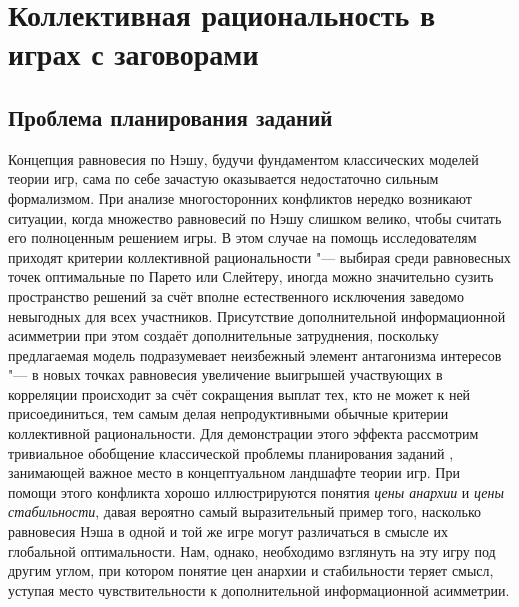 \chapter{Коллективная рациональность в играх с заговорами}\label{ch:ch2}

\section{Проблема планирования заданий}\label{sec:ch2/sec1}

Концепция равновесия по Нэшу, будучи фундаментом классических моделей теории игр, сама по себе зачастую оказывается недостаточно сильным формализмом. При анализе многосторонних конфликтов нередко возникают ситуации, когда множество равновесий по Нэшу слишком велико, чтобы считать его полноценным решением игры. В этом случае на помощь исследователям приходят критерии коллективной рациональности "--- выбирая среди равновесных точек оптимальные по Парето или Слейтеру, иногда можно значительно сузить пространство решений за счёт вполне естественного исключения заведомо невыгодных для всех участников. Присутствие дополнительной информационной асимметрии при этом создаёт дополнительные затруднения, поскольку предлагаемая модель подразумевает неизбежный элемент антагонизма интересов "--- в новых точках равновесия увеличение выигрышей участвующих в корреляции происходит за счёт сокращения выплат тех, кто не может к ней присоединиться, тем самым делая непродуктивными обычные критерии коллективной рациональности. Для демонстрации этого эффекта рассмотрим тривиальное обобщение классической проблемы планирования заданий \cite{Koutsoupias}, занимающей важное место в концептуальном ландшафте теории игр. При помощи этого конфликта хорошо иллюстрируются понятия \emph{цены анархии} и \emph{цены стабильности}, давая вероятно самый выразительный пример того, насколько равновесия Нэша в одной и той же игре могут различаться в смысле их глобальной оптимальности. Нам, однако, необходимо взглянуть на эту игру под другим углом, при котором понятие цен анархии и стабильности теряет смысл, уступая место чувствительности к дополнительной информационной асимметрии.

